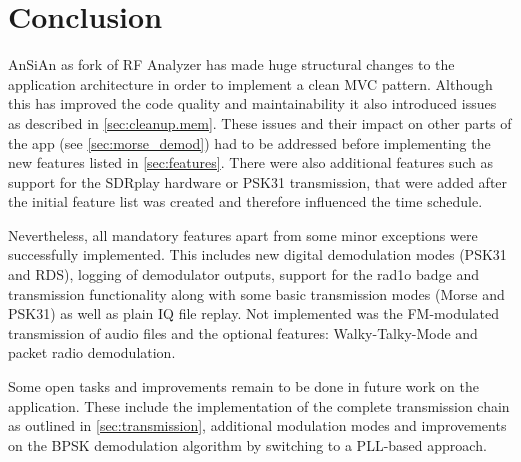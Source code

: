 \chapter{Conclusion\label{ch:conclusion}}

\ac{AnSiAn} as fork of RF Analyzer has made huge structural changes to the
application architecture in order to implement a clean \ac{MVC} pattern.
Although this has improved the code quality and maintainability it also
introduced issues as described in \autoref{sec:cleanup.mem}. These issues and
their impact on other parts of the app (see \autoref{sec:morse_demod}) had to
be addressed before implementing the new features listed in
\autoref{sec:features}. There were also additional features such as support for
the SDRplay hardware or PSK31 transmission, that were added after the initial
feature list was created and therefore influenced the time schedule.

Nevertheless, all mandatory features apart from some minor exceptions
were successfully implemented. This includes new digital demodulation
modes (PSK31 and RDS), logging of demodulator outputs, support for the
rad1o badge and transmission functionality along with some basic transmission
modes (Morse and PSK31) as well as plain IQ file replay. Not implemented
was the \ac{FM}-modulated transmission of audio files and the optional features:
Walky-Talky-Mode and packet radio demodulation.

Some open tasks and improvements remain to be done in future work on the
application. These include the implementation of the complete transmission
chain as outlined in \autoref{sec:transmission}, additional modulation modes
and improvements on the \ac{BPSK} demodulation algorithm by switching to
a \ac{PLL}-based approach.
